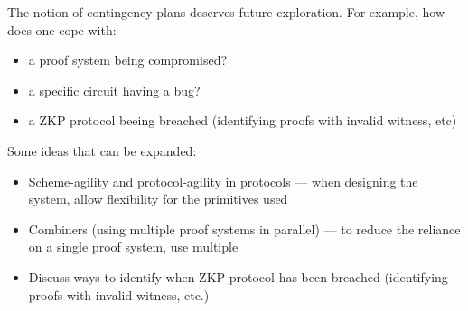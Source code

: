 The notion of contingency plans deserves future exploration. For example, how does one cope with:
\begin{itemize}
    \item a proof system being compromised? 
    \item a specific circuit having a bug?  
    \item a ZKP protocol beeing breached (identifying proofs with invalid witness, etc)
\end{itemize}

Some ideas that can be expanded:
\begin{itemize}
    \item Scheme-agility and protocol-agility in protocols --- when designing the system, allow flexibility for the primitives used
    \item Combiners (using multiple proof systems in parallel) --- to reduce the reliance on a single proof system, use multiple
    \item Discuss ways to identify when ZKP protocol has been breached (identifying proofs with invalid witness, etc.)
\end{itemize}


